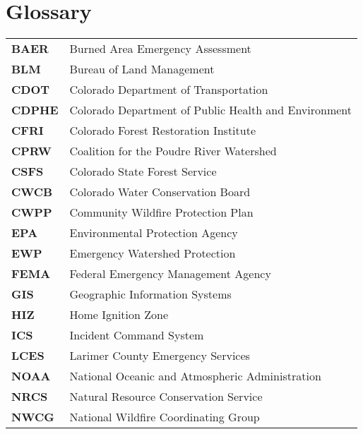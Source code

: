 \documentclass[
]{article}
\begin{document}
\thispagestyle{empty}
\begin{singlespace}
\renewcommand{\cftsecleader}{\cftdotfill{\cftdotsep}}
\setcounter{tocdepth}{3}
\tableofcontents
\clearpage
{}
{}
\listoftables
\clearpage
{}
{}
\listoffigures
\clearpage
\end{singlespace}

\section*{Glossary}

\begin{longtable}{>{}ll}

\textbf{BAER} & Burned Area Emergency Assessment\\
\textbf{BLM} & Bureau of Land Management\\
\textbf{CDOT} & Colorado Department of Transportation\\
\textbf{CDPHE} & Colorado Department of Public Health and Environment\\
\textbf{CFRI} & Colorado Forest Restoration Institute\\
\addlinespace
\textbf{CPRW} & Coalition for the Poudre River Watershed\\
\textbf{CSFS} & Colorado State Forest Service\\
\textbf{CWCB} & Colorado Water Conservation Board\\
\textbf{CWPP} & Community Wildfire Protection Plan\\
\textbf{EPA} & Environmental Protection Agency\\
\addlinespace
\textbf{EWP} & Emergency Watershed Protection\\
\textbf{FEMA} & Federal Emergency Management Agency\\
\textbf{GIS} & Geographic Information Systems\\
\textbf{HIZ} & Home Ignition Zone\\
\textbf{ICS} & Incident Command System\\
\addlinespace
\textbf{LCES} & Larimer County Emergency Services\\
\textbf{NOAA} & National Oceanic and Atmospheric Administration\\
\textbf{NRCS} & Natural Resource Conservation Service\\
\textbf{NWCG} & National Wildfire Coordinating Group\\

\end{longtable}
\end{document}
